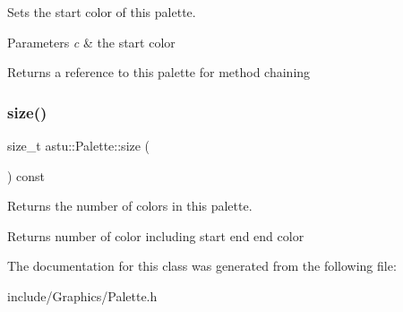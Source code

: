 Sets the start color of this palette.


\begin{DoxyParams}{Parameters}
{\em c} & the start color \\
\hline
\end{DoxyParams}
\begin{DoxyReturn}{Returns}
a reference to this palette for method chaining 
\end{DoxyReturn}
\mbox{\label{classastu_1_1Palette_a966a720d7f24685c88c8a711ad284488}} 
\subsubsection{\texorpdfstring{size()}{size()}}
{\footnotesize\ttfamily size\+\_\+t astu\+::\+Palette\+::size (\begin{DoxyParamCaption}{ }\end{DoxyParamCaption}) const}

Returns the number of colors in this palette.

\begin{DoxyReturn}{Returns}
number of color including start end end color 
\end{DoxyReturn}


The documentation for this class was generated from the following file\+:\begin{DoxyCompactItemize}
\item 
include/\+Graphics/Palette.\+h\end{DoxyCompactItemize}
